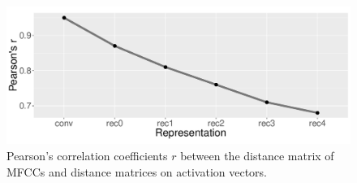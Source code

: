%
%
%



\begin{figure}[t]
  \centering
  \includegraphics[scale=0.28]{figures/correlation_mfcc.pdf}
  \caption{Pearson's correlation coefficients $r$ between the distance matrix of MFCCs and distance matrices on activation vectors.}
  \label{fig:correlation}
\end{figure}


